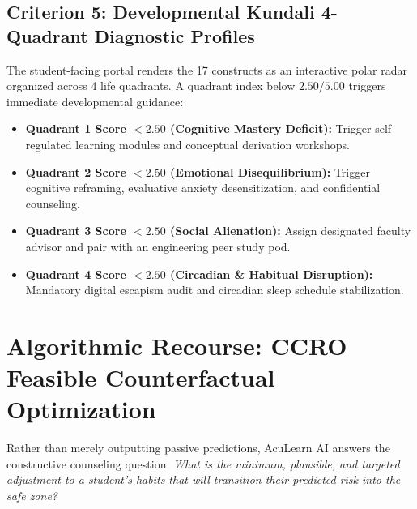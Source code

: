 \documentclass[10pt,a4paper]{article}
\begin{document}
\subsection{Criterion 5: Developmental Kundali 4-Quadrant Diagnostic Profiles}
The student-facing portal renders the 17 constructs as an interactive polar radar organized across 4 life quadrants. A quadrant index below $2.50 / 5.00$ triggers immediate developmental guidance:
\begin{itemize}[noitemsep, topsep=2pt]
  \item \textbf{Quadrant 1 Score $< 2.50$ (Cognitive Mastery Deficit):} Trigger self-regulated learning modules and conceptual derivation workshops.
  \item \textbf{Quadrant 2 Score $< 2.50$ (Emotional Disequilibrium):} Trigger cognitive reframing, evaluative anxiety desensitization, and confidential counseling.
  \item \textbf{Quadrant 3 Score $< 2.50$ (Social Alienation):} Assign designated faculty advisor and pair with an engineering peer study pod.
  \item \textbf{Quadrant 4 Score $< 2.50$ (Circadian \& Habitual Disruption):} Mandatory digital escapism audit and circadian sleep schedule stabilization.
\end{itemize}

\section{Algorithmic Recourse: CCRO Feasible Counterfactual Optimization}

Rather than merely outputting passive predictions, AcuLearn AI answers the constructive counseling question: \textit{What is the minimum, plausible, and targeted adjustment to a student's habits that will transition their predicted risk into the safe zone?}
\end{document}
